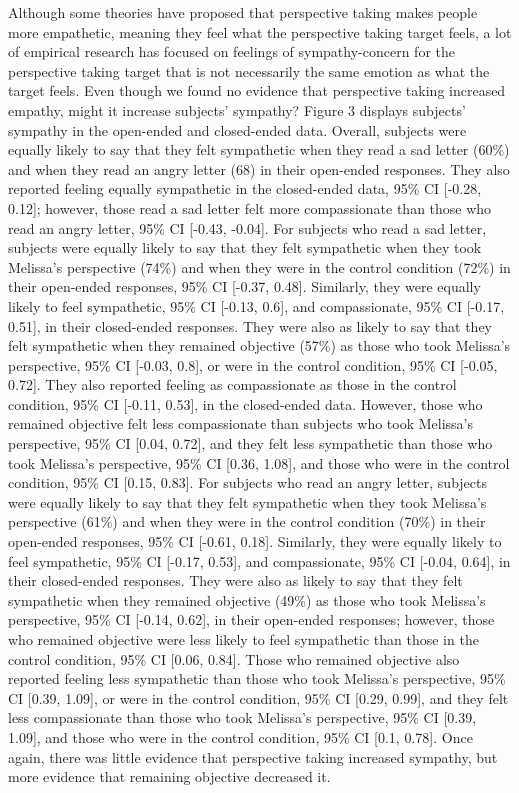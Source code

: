 \documentclass[man,a4paper,noextraspace,apacite]{apa6}\usepackage[]{graphicx}\usepackage[]{color}
\begin{document}
    Although some theories have proposed that perspective taking makes people more empathetic, meaning they feel what the perspective taking target feels, a lot of empirical research has focused on feelings of sympathy-concern for the perspective taking target that is not necessarily the same emotion as what the target feels. Even though we found no evidence that perspective taking increased empathy, might it increase subjects' sympathy?
    Figure 3 displays subjects' sympathy in the open-ended and closed-ended data. Overall, subjects were equally likely to say that they felt sympathetic when they read a sad letter (60\%) and when they read an angry letter (68) in their open-ended responses. They also reported feeling equally sympathetic in the closed-ended data, 95\% CI [-0.28, 0.12]; however, those read a sad letter felt more compassionate than those who read an angry letter, 95\% CI [-0.43, -0.04].
    For subjects who read a sad letter, subjects were equally likely to say that they felt sympathetic when they took Melissa's perspective (74\%) and when they were in the control condition (72\%) in their open-ended responses, 95\% CI [-0.37, 0.48]. Similarly, they were equally likely to feel sympathetic, 95\% CI [-0.13, 0.6], and compassionate, 95\% CI [-0.17, 0.51], in their closed-ended responses. They were also as likely to say that they felt sympathetic when they remained objective (57\%) as those who took Melissa's perspective, 95\% CI [-0.03, 0.8], or were in the control condition, 95\% CI [-0.05, 0.72]. They also reported feeling as compassionate as those in the control condition, 95\% CI [-0.11, 0.53], in the closed-ended data. However, those who remained objective felt less compassionate than subjects who took Melissa's perspective, 95\% CI [0.04, 0.72], and they felt less sympathetic than those who took Melissa's perspective, 95\% CI [0.36, 1.08], and those who were in the control condition, 95\% CI [0.15, 0.83].
    For subjects who read an angry letter, subjects were equally likely to say that they felt sympathetic when they took Melissa's perspective (61\%) and when they were in the control condition (70\%) in their open-ended responses, 95\% CI [-0.61, 0.18]. Similarly, they were equally likely to feel sympathetic, 95\% CI [-0.17, 0.53], and compassionate, 95\% CI [-0.04, 0.64], in their closed-ended responses. They were also as likely to say that they felt sympathetic when they remained objective (49\%) as those who took Melissa's perspective, 95\% CI [-0.14, 0.62], in their open-ended responses; however, those who remained objective were less likely to feel sympathetic than those in the control condition, 95\% CI [0.06, 0.84]. Those who remained objective also reported feeling less sympathetic than those who took Melissa's perspective, 95\% CI [0.39, 1.09], or were in the control condition, 95\% CI [0.29, 0.99], and they felt less compassionate than those who took Melissa's perspective, 95\% CI [0.39, 1.09], and those who were in the control condition, 95\% CI [0.1, 0.78].
    Once again, there was little evidence that perspective taking increased sympathy, but more evidence that remaining objective decreased it.
\end{document}
